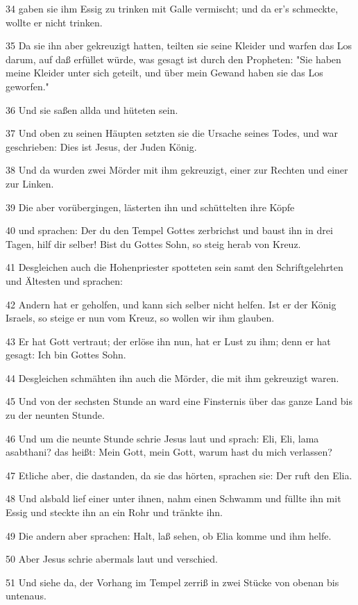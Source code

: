 \par 34 gaben sie ihm Essig zu trinken mit Galle vermischt; und da er's schmeckte, wollte er nicht trinken.
\par 35 Da sie ihn aber gekreuzigt hatten, teilten sie seine Kleider und warfen das Los darum, auf daß erfüllet würde, was gesagt ist durch den Propheten: "Sie haben meine Kleider unter sich geteilt, und über mein Gewand haben sie das Los geworfen."
\par 36 Und sie saßen allda und hüteten sein.
\par 37 Und oben zu seinen Häupten setzten sie die Ursache seines Todes, und war geschrieben: Dies ist Jesus, der Juden König.
\par 38 Und da wurden zwei Mörder mit ihm gekreuzigt, einer zur Rechten und einer zur Linken.
\par 39 Die aber vorübergingen, lästerten ihn und schüttelten ihre Köpfe
\par 40 und sprachen: Der du den Tempel Gottes zerbrichst und baust ihn in drei Tagen, hilf dir selber! Bist du Gottes Sohn, so steig herab von Kreuz.
\par 41 Desgleichen auch die Hohenpriester spotteten sein samt den Schriftgelehrten und Ältesten und sprachen:
\par 42 Andern hat er geholfen, und kann sich selber nicht helfen. Ist er der König Israels, so steige er nun vom Kreuz, so wollen wir ihm glauben.
\par 43 Er hat Gott vertraut; der erlöse ihn nun, hat er Lust zu ihm; denn er hat gesagt: Ich bin Gottes Sohn.
\par 44 Desgleichen schmähten ihn auch die Mörder, die mit ihm gekreuzigt waren.
\par 45 Und von der sechsten Stunde an ward eine Finsternis über das ganze Land bis zu der neunten Stunde.
\par 46 Und um die neunte Stunde schrie Jesus laut und sprach: Eli, Eli, lama asabthani? das heißt: Mein Gott, mein Gott, warum hast du mich verlassen?
\par 47 Etliche aber, die dastanden, da sie das hörten, sprachen sie: Der ruft den Elia.
\par 48 Und alsbald lief einer unter ihnen, nahm einen Schwamm und füllte ihn mit Essig und steckte ihn an ein Rohr und tränkte ihn.
\par 49 Die andern aber sprachen: Halt, laß sehen, ob Elia komme und ihm helfe.
\par 50 Aber Jesus schrie abermals laut und verschied.
\par 51 Und siehe da, der Vorhang im Tempel zerriß in zwei Stücke von obenan bis untenaus.
